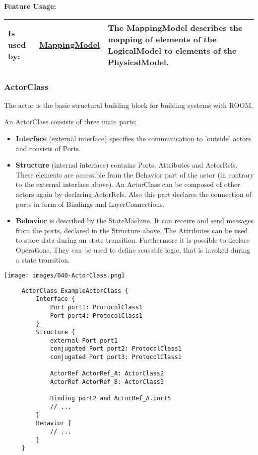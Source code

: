 	\begingroup
	\textbf{Feature Usage:}
	\renewcommand{\arraystretch}{1.8} %
	\begin{longtable}{l|l p{}}
		\hline
	Is used by: & \tabitem \hyperlink{ref:MappingModel}{MappingModel}  & The MappingModel describes the mapping of elements of the LogicalModel to elements of the PhysicalModel.\\
	\hline
	\end{longtable}
	\endgroup
		
	
	\vspace{\baselineskip}
	\vspace{\baselineskip}
	\vspace{\baselineskip}
	
\subsubsection{ActorClass}
	\hypertarget{ref:ActorClass}{}
	The actor is the basic structural building block for building systems with ROOM.
		
	An ActorClass consists of three main parts:
	\begin{itemize}
	\item \textbf{Interface} (external interface) specifies the communication to 'outside' actors and consists of Ports.
	\item \textbf{Structure} (internal interface) contains Ports, Attributes and ActorRefs. These elements are accessible from the Behavior part of the actor (in contrary to the external interface above). An ActorClass can be composed of other actors again by declaring ActorRefs. Also this part declares the connection of ports in form of Bindings and LayerConnections.
	\item \textbf{Behavior} is described by the StateMachine. It can receive and send messages from the ports, declared in the Structure above. The Attributes can be used to store data during an state transition. Furthermore it is possible to declare Operations. They can be used to define reusable logic, that is invoked during a state transition.
	\end{itemize}	
	
	\texttt{[image: images/040-ActorClass.png]}
	\begin{lstlisting}
	 ActorClass ExampleActorClass {
		 Interface {
			 Port port1: ProtocolClass1
			 Port port4: ProtocolClass1
		 }
		 Structure {
			 external Port port1
			 conjugated Port port2: ProtocolClass1
			 conjugated Port port3: ProtocolClass1
			 
			 ActorRef ActorRef_A: ActorClass2
			 ActorRef ActorRef_B: ActorClass3
			 
			 Binding port2 and ActorRef_A.port5
			 // ...
		 }
		 Behavior {
			 // ...
		 }
	 }
	 \end{lstlisting}
		
